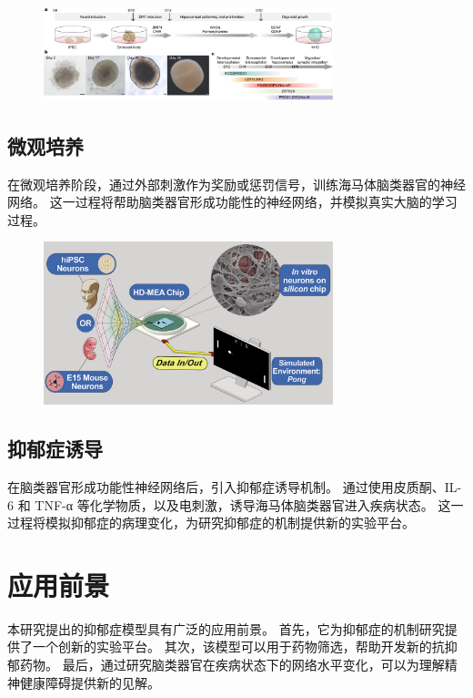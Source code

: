 \begin{figure}[!htbp]
    \centering
    \includegraphics[width=0.75\textwidth]{Img/hipp-organoid.jpg}
    \label{fig:hipp-organoid}
\end{figure}

\subsection{微观培养}\label{subsec:micro-culture}
在微观培养阶段，通过外部刺激作为奖励或惩罚信号，训练海马体脑类器官的神经网络。
这一过程将帮助脑类器官形成功能性的神经网络，并模拟真实大脑的学习过程。

\begin{figure}[!htbp]
    \centering
    \includegraphics[width=0.75\textwidth]{Img/demo-dishbarin.png}
    \label{fig:demo-dishbarin}
\end{figure}

\subsection{抑郁症诱导}\label{subsec:depression-induction}
在脑类器官形成功能性神经网络后，引入抑郁症诱导机制。
通过使用皮质酮\cite{wang2024corticosterone, snyder2011adult}、IL-6 和 TNF-α 等化学物质，以及电刺激，诱导海马体脑类器官进入疾病状态。
这一过程将模拟抑郁症的病理变化，为研究抑郁症的机制提供新的实验平台。


\section{应用前景}\label{sec:application-prospect}
本研究提出的抑郁症模型具有广泛的应用前景。
首先，它为抑郁症的机制研究提供了一个创新的实验平台。
其次，该模型可以用于药物筛选，帮助开发新的抗抑郁药物。
最后，通过研究脑类器官在疾病状态下的网络水平变化，可以为理解精神健康障碍提供新的见解。


